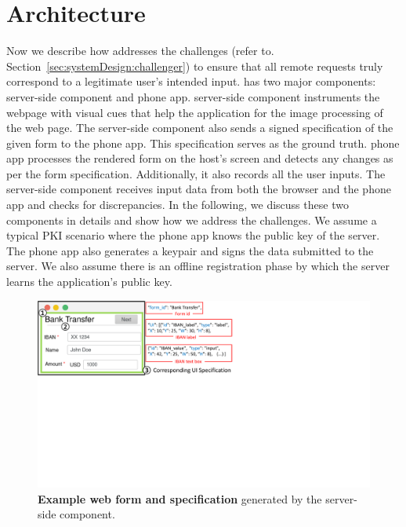 \section{\sysname Architecture} \label{sec:hardenUI}

 Now we describe how \sysname addresses the challenges (refer to. Section~\ref{sec:systemDesign:challenger}) to ensure that all remote requests truly correspond to a legitimate user's intended input. \sysname has two major components: \name server-side component and \name phone app. \name server-side component instruments the webpage with visual cues that help the \name application for the image processing of the web page. The server-side component also sends a signed specification of the given form to the phone app. This specification serves as the ground truth. \name phone app processes the rendered form on the host's screen and detects any changes as per the form specification. Additionally, it also records all the user inputs. The \name server-side component receives input data from both the browser and the phone app and checks for discrepancies. In the following, we discuss these two components in details and show how we address the challenges. We assume a typical PKI scenario where the phone app knows the public key of the server. The phone app also generates a keypair and signs the data submitted to the server. We also assume there is an offline registration phase by which the server learns the \sysname application's public key.

\begin{figure}[t]
	\centering
\includegraphics[trim={0 11.5cm 14cm 0},clip, width=0.8\linewidth]{chapters/IntegriScreen/newImg/runningExample.pdf} 
	\caption[Example web form and specification generated by the \name server-side component]{\textbf{Example web form and specification} generated by the \name server-side component.}
	\label{fig:runningExample}
\end{figure}



